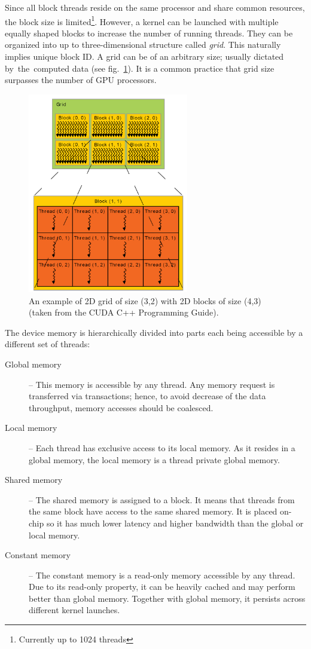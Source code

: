 Since all block threads reside on the same processor and share common resources, the block size is limited\footnote{Currently up to 1024 threads}. However, a kernel can be launched with multiple equally shaped blocks to increase the number of running threads. They can be organized into up to three-dimensional structure called \emph{grid}. This naturally implies unique block ID. A grid can be of an arbitrary size; usually dictated by~the~computed data (see fig.~\ref{fig02:grid}). It is a common practice that grid size surpasses the number of GPU processors.


\begin{figure}\centering
	\includegraphics[width=7cm]{img/grid}
	\caption{An example of 2D grid of size (3,2) with 2D blocks of size (4,3) (taken from the CUDA C++ Programming Guide).}
	\label{fig02:grid}
\end{figure}


The device memory is hierarchically divided into parts each being accessible by a different set of threads:

\begin{description}
	\item[Global memory] -- This memory is accessible by any thread. Any memory request is transferred via transactions; hence, to avoid decrease of the data throughput, memory accesses should be coalesced. 
	\item[Local memory] -- Each thread has exclusive access to its local memory. As it resides in a global memory, the local memory is a thread private global memory.
	\item[Shared memory] -- The shared memory is assigned to a block. It means that threads from the same block have access to the same shared memory. It is placed on-chip so it has much lower latency and higher bandwidth than the global or local memory.
	\item[Constant memory] -- The constant memory is a read-only memory accessible by any thread. Due to its read-only property, it can be heavily cached and may perform better than global memory. Together with global memory, it persists across different kernel launches.
\end{description}

